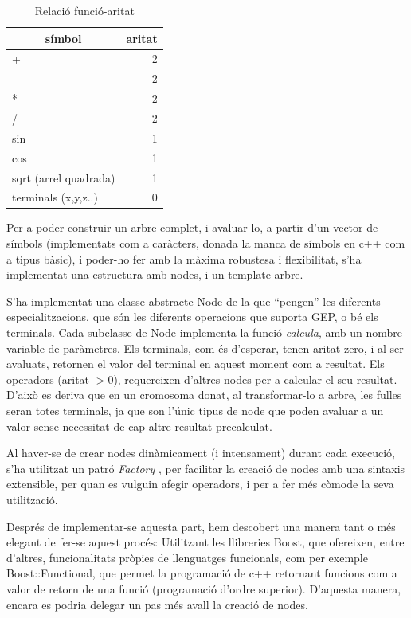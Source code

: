 \begin{table}
\centering
\caption{Relació funció-aritat}
\begin{tabular}{|l|r|}
\hline
\multicolumn{1}{|c|}{\textbf{símbol }} & \multicolumn{1}{c|}{\textbf{ aritat}} \\
\hline
\hline
+                     & 2 \\
-                     & 2 \\
*                     & 2 \\
/                     & 2 \\
sin                   & 1 \\
cos                   & 1 \\
sqrt (arrel quadrada) & 1 \\
terminals (x,y,z..)   & 0 \\
\hline
\end{tabular}
\label{table:func-aritat}
\end{table}

Per a poder construir un arbre complet, i avaluar-lo, a partir d'un vector de
símbols (implementats com a caràcters, donada la manca de símbols en c++ com a
tipus bàsic), i poder-ho fer amb la màxima robustesa i flexibilitat, s'ha
implementat una estructura amb nodes, i un template arbre. 

S'ha implementat una classe abstracte Node de la que ``pengen'' les diferents
especialitzacions, que són les diferents operacions que suporta GEP, o bé els
terminals.  Cada subclasse de Node implementa la funció \emph{calcula}, amb un
nombre variable de paràmetres.  Els terminals, com és d'esperar, tenen aritat
zero, i al ser avaluats, retornen el valor del terminal en aquest moment com a
resultat.  Els operadors (aritat $>0$), requereixen d'altres nodes per a
calcular el seu resultat.  D'això es deriva que en un cromosoma donat, al
transformar-lo a arbre, les fulles seran totes terminals, ja que son l'únic
tipus de node que poden avaluar a un valor sense necessitat de cap altre
resultat precalculat.

Al haver-se de crear nodes dinàmicament (i intensament) durant cada execució,
s'ha utilitzat un patró \emph{Factory} \cite{GoF94}, per facilitar la creació de nodes amb
una sintaxis extensible, per quan es vulguin afegir operadors, i per a fer més
còmode la seva utilització.

Després de implementar-se aquesta part, hem descobert una manera tant o més
elegant de fer-se aquest procés:  Utilitzant les llibreries Boost\cite{GABOOST}, que
ofereixen, entre d'altres, funcionalitats pròpies de llenguatges funcionals,
com per exemple Boost::Functional, que permet la programació de c++ retornant
funcions com a valor de retorn de una funció (programació d'ordre superior).  
D'aquesta manera, encara es podria delegar un pas més avall la creació de nodes.

